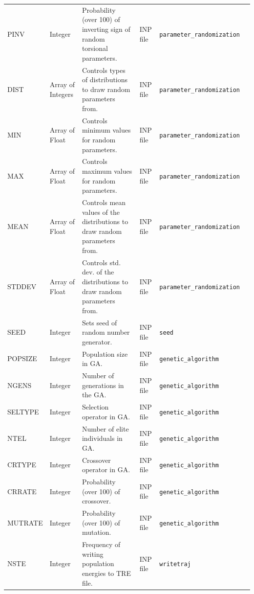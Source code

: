 \documentclass[10pt,a4paper,openany]{memoir}
\numberwithin{equation}{section}
\begin{document}
\begin{landscape}
\begin{center}
\begin{longtable}{llllll}
      PINV & Integer & Probability (over 100) of inverting sign of random torsional parameters. & INP file & \texttt{parameter\_randomization} & \autopageref{descr:pinv}\\
      DIST & Array of Integers & Controls types of distributions to draw random parameters from. & INP file & \texttt{parameter\_randomization} & \autopageref{descr:dist}\\
      MIN & Array of Float & Controls minimum values for random parameters. & INP file & \texttt{parameter\_randomization} & \autopageref{descr:min}\\
      MAX & Array of Float & Controls maximum values for random parameters. & INP file & \texttt{parameter\_randomization} & \autopageref{descr:max}\\
      MEAN & Array of Float & Controls mean values of the distributions to draw random parameters from. & INP file & \texttt{parameter\_randomization} & \autopageref{descr:mean}\\
      STDDEV & Array of Float & Controls std. dev. of the distributions to draw random parameters from. & INP file & \texttt{parameter\_randomization} & \autopageref{descr:stddev}\\
      SEED & Integer & Sets seed of random number generator. & INP file & \texttt{seed} & \autopageref{descr:seed}\\
      POPSIZE & Integer & Population size in GA. & INP file & \texttt{genetic\_algorithm} & \autopageref{descr:popsize}\\
      NGENS & Integer & Number of generations in the GA. & INP file & \texttt{genetic\_algorithm} & \autopageref{descr:ngens}\\
      SELTYPE & Integer & Selection operator in GA. & INP file & \texttt{genetic\_algorithm} & \autopageref{descr:seltype}\\
      NTEL & Integer & Number of elite individuals in GA. & INP file & \texttt{genetic\_algorithm} & \autopageref{descr:ntel}\\
      CRTYPE & Integer & Crossover operator in GA. & INP file & \texttt{genetic\_algorithm} & \autopageref{descr:crtype}\\
      CRRATE & Integer & Probability (over 100) of crossover. & INP file & \texttt{genetic\_algorithm} & \autopageref{descr:crrate}\\
      MUTRATE & Integer & Probability (over 100) of mutation. & INP file & \texttt{genetic\_algorithm} & \autopageref{descr:mutrate}\\
      NSTE & Integer & Frequency of writing population energies to TRE file. & INP file & \texttt{writetraj} & \autopageref{descr:nste}\\

\end{longtable}
\end{center}
\end{landscape}
\end{document}
